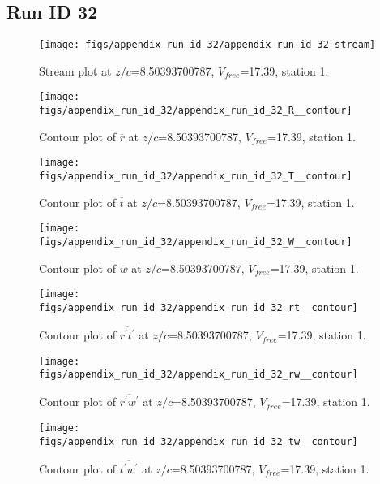 \subsection{Run ID 32}
\begin{figure}[H]
\centering
\texttt{[image: figs/appendix\_run\_id\_32/appendix\_run\_id\_32\_stream]}
\caption{Stream plot at $z/c$=8.50393700787, $V_{free}$=17.39, station 1.}
\label{fig:appendix_run_id_32_stream}
\end{figure}


\begin{figure}[H]
\centering
\texttt{[image: figs/appendix\_run\_id\_32/appendix\_run\_id\_32\_R\_\_contour]}
\caption{Contour plot of $\overline{r}$ at $z/c$=8.50393700787, $V_{free}$=17.39, station 1.}
\label{fig:appendix_run_id_32_R__contour}
\end{figure}


\begin{figure}[H]
\centering
\texttt{[image: figs/appendix\_run\_id\_32/appendix\_run\_id\_32\_T\_\_contour]}
\caption{Contour plot of $\overline{t}$ at $z/c$=8.50393700787, $V_{free}$=17.39, station 1.}
\label{fig:appendix_run_id_32_T__contour}
\end{figure}


\begin{figure}[H]
\centering
\texttt{[image: figs/appendix\_run\_id\_32/appendix\_run\_id\_32\_W\_\_contour]}
\caption{Contour plot of $\overline{w}$ at $z/c$=8.50393700787, $V_{free}$=17.39, station 1.}
\label{fig:appendix_run_id_32_W__contour}
\end{figure}


\begin{figure}[H]
\centering
\texttt{[image: figs/appendix\_run\_id\_32/appendix\_run\_id\_32\_rt\_\_contour]}
\caption{Contour plot of $\overline{r^\prime t^\prime}$ at $z/c$=8.50393700787, $V_{free}$=17.39, station 1.}
\label{fig:appendix_run_id_32_rt__contour}
\end{figure}


\begin{figure}[H]
\centering
\texttt{[image: figs/appendix\_run\_id\_32/appendix\_run\_id\_32\_rw\_\_contour]}
\caption{Contour plot of $\overline{r^\prime w^\prime}$ at $z/c$=8.50393700787, $V_{free}$=17.39, station 1.}
\label{fig:appendix_run_id_32_rw__contour}
\end{figure}


\begin{figure}[H]
\centering
\texttt{[image: figs/appendix\_run\_id\_32/appendix\_run\_id\_32\_tw\_\_contour]}
\caption{Contour plot of $\overline{t^\prime w^\prime}$ at $z/c$=8.50393700787, $V_{free}$=17.39, station 1.}
\label{fig:appendix_run_id_32_tw__contour}
\end{figure}


